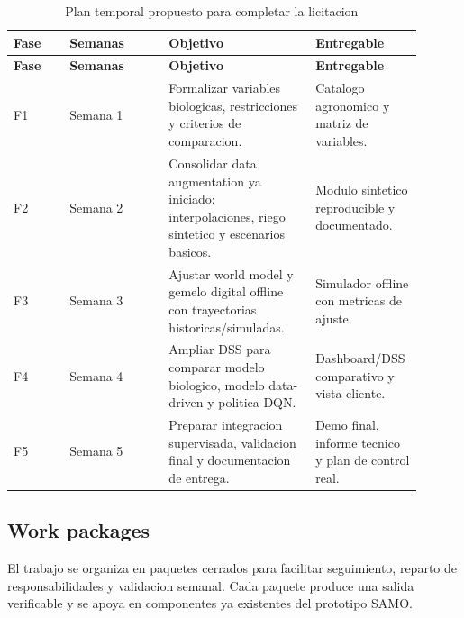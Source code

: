 ﻿\documentclass[11pt,a4paper]{article}
\begin{document}
\begin{longtable}{p{0.13\linewidth}p{0.23\linewidth}p{0.34\linewidth}p{0.20\linewidth}}
\caption{Plan temporal propuesto para completar la licitacion}\\
\toprule
\textbf{Fase} & \textbf{Semanas} & \textbf{Objetivo} & \textbf{Entregable} \\
\midrule
\endfirsthead
\toprule
\textbf{Fase} & \textbf{Semanas} & \textbf{Objetivo} & \textbf{Entregable} \\
\midrule
\endhead
F1 & Semana 1 & Formalizar variables biologicas, restricciones y criterios de comparacion. & Catalogo agronomico y matriz de variables. \\ \addlinespace
F2 & Semana 2 & Consolidar data augmentation ya iniciado: interpolaciones, riego sintetico y escenarios basicos. & Modulo sintetico reproducible y documentado. \\ \addlinespace
F3 & Semana 3 & Ajustar world model y gemelo digital offline con trayectorias historicas/simuladas. & Simulador offline con metricas de ajuste. \\ \addlinespace
F4 & Semana 4 & Ampliar DSS para comparar modelo biologico, modelo data-driven y politica DQN. & Dashboard/DSS comparativo y vista cliente. \\ \addlinespace
F5 & Semana 5 & Preparar integracion supervisada, validacion final y documentacion de entrega. & Demo final, informe tecnico y plan de control real. \\
\bottomrule
\end{longtable}

\subsection{Work packages}

El trabajo se organiza en paquetes cerrados para facilitar seguimiento, reparto de responsabilidades y validacion semanal. Cada paquete produce una salida verificable y se apoya en componentes ya existentes del prototipo SAMO.
\end{document}
